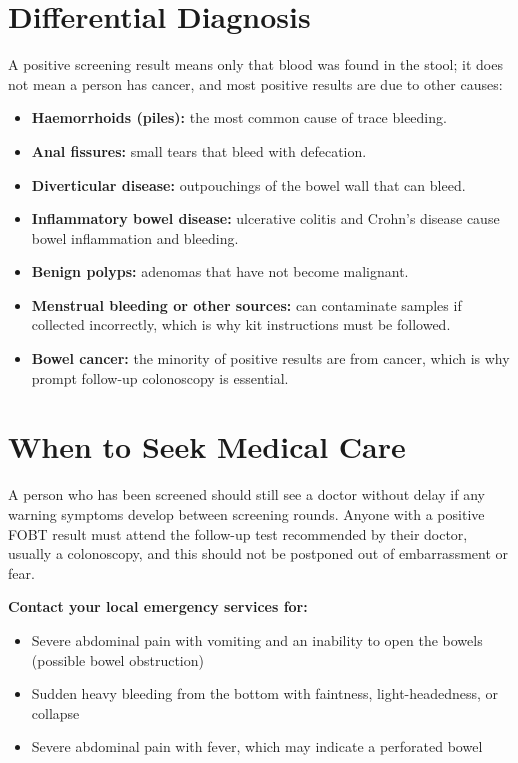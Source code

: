 \section*{Differential Diagnosis}
A positive screening result means only that blood was found in the stool; it does not mean a person has cancer, and most positive results are due to other causes:
\begin{itemize}
    \item \textbf{Haemorrhoids (piles):} the most common cause of trace bleeding.
    \item \textbf{Anal fissures:} small tears that bleed with defecation.
    \item \textbf{Diverticular disease:} outpouchings of the bowel wall that can bleed.
    \item \textbf{Inflammatory bowel disease:} ulcerative colitis and Crohn's disease cause bowel inflammation and bleeding.
    \item \textbf{Benign polyps:} adenomas that have not become malignant.
    \item \textbf{Menstrual bleeding or other sources:} can contaminate samples if collected incorrectly, which is why kit instructions must be followed.
    \item \textbf{Bowel cancer:} the minority of positive results are from cancer, which is why prompt follow-up colonoscopy is essential.
\end{itemize}

\section*{When to Seek Medical Care}
A person who has been screened should still see a doctor without delay if any warning symptoms develop between screening rounds. Anyone with a positive FOBT result must attend the follow-up test recommended by their doctor, usually a colonoscopy, and this should not be postponed out of embarrassment or fear.

\textbf{Contact your local emergency services for:}
\begin{itemize}
    \item Severe abdominal pain with vomiting and an inability to open the bowels (possible bowel obstruction)
    \item Sudden heavy bleeding from the bottom with faintness, light-headedness, or collapse
    \item Severe abdominal pain with fever, which may indicate a perforated bowel
\end{itemize}

